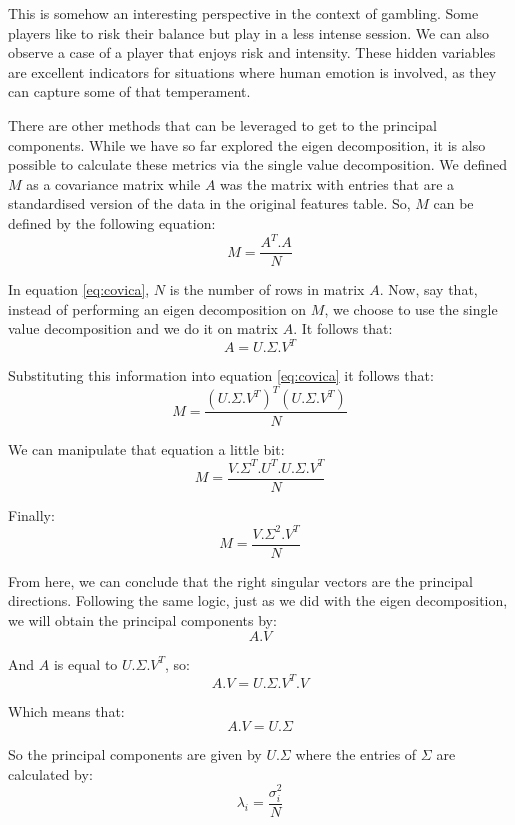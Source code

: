 \documentclass[600paper, 11pt,twoside,openany]{kdp}
\begin{document}
\indent This is somehow an interesting perspective in the context of gambling. Some players like to risk their balance but play in a less intense session. We can also observe a case of a player that enjoys risk and intensity. These hidden variables are excellent indicators for situations where human emotion is involved, as they can capture some of that temperament.
\par 
\vspace{-3pt}
\indent 
There are other methods that can be leveraged to get to the principal components. While we have so far explored the eigen decomposition, it is also possible to calculate these metrics via the single value decomposition. We defined $M$ as a covariance matrix while $A$ was the matrix with entries that are a standardised version of the data in the original features table. So, $M$ can be defined by the following equation:
\begin{equation}\label{eq:covica}
M = \frac{A^T.A}{N}
\end{equation}
\par 
\vspace{-3pt}
\indent In equation \ref{eq:covica}, $N$ is the number of rows in matrix $A$. Now, say that, instead of performing an eigen decomposition on $M$, we choose to use the single value decomposition and we do it on matrix $A$. It follows that:
\[A = U.\Sigma.V^T\]
\par 
\vspace{-3pt}
\indent Substituting this information into equation \ref{eq:covica}  it follows that:
\[M = \frac{(U.\Sigma.V^T)^T(U.\Sigma.V^T)}{N}\]
\par 
\vspace{-3pt}
\indent We can manipulate that equation a little bit:
\[M = \frac{V.\Sigma^T.U^T.U.\Sigma.V^T}{N}\]
\par 
\vspace{-3pt}
\indent Finally:
\begin{equation}
M = \frac{V.\Sigma^2.V^T}{N}
\end{equation}
\par 
\vspace{-3pt}
\indent From here, we can conclude that the right singular vectors are the principal directions. Following the same logic, just as we did with the eigen decomposition, we will obtain the principal components by:
\[ A.V \]
\par 
\vspace{-3pt}
\indent And $A$ is equal to $U.\Sigma.V^T$, so:
\[A.V = U.\Sigma.V^T.V\]
\par 
\vspace{-3pt}
\indent Which means that:
\[A.V = U.\Sigma \]
\par 
\vspace{-3pt}
\indent So the principal components are given by $U.\Sigma$ where the entries of $\Sigma$ are calculated by: 
\[ \lambda_i = \frac{\sigma_i^2}{N}\]
\par 
\vspace{-3pt}
\end{document}
